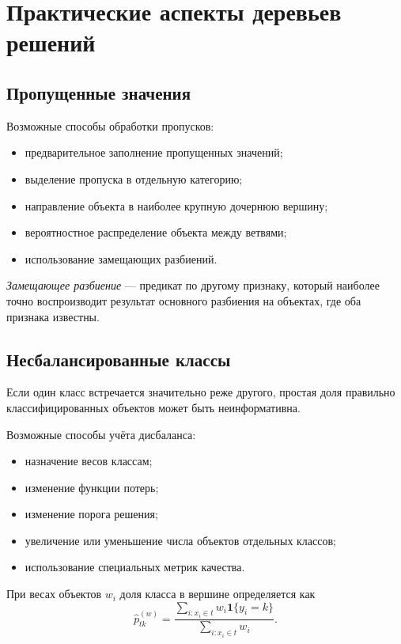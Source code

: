 \documentclass[12pt,a4paper]{article}
\theoremstyle{plain}
\theoremstyle{definition}
\theoremstyle{remark}
\newcommand{\ind}{\mathbf{1}}
\begin{document}
\section{Практические аспекты деревьев решений}

\subsection{Пропущенные значения}

Возможные способы обработки пропусков:
\begin{itemize}
    \item предварительное заполнение пропущенных значений;
    \item выделение пропуска в отдельную категорию;
    \item направление объекта в наиболее крупную дочернюю вершину;
    \item вероятностное распределение объекта между ветвями;
    \item использование замещающих разбиений.
\end{itemize}

\emph{Замещающее разбиение} --- предикат по другому признаку, который
наиболее точно воспроизводит результат основного разбиения на объектах,
где оба признака известны.

\subsection{Несбалансированные классы}

Если один класс встречается значительно реже другого, простая доля
правильно классифицированных объектов может быть неинформативна.

Возможные способы учёта дисбаланса:
\begin{itemize}
    \item назначение весов классам;
    \item изменение функции потерь;
    \item изменение порога решения;
    \item увеличение или уменьшение числа объектов отдельных классов;
    \item использование специальных метрик качества.
\end{itemize}

При весах объектов $w_i$ доля класса в вершине определяется как
\[
    \widehat{p}_{tk}^{(w)}
    =
    \frac{
        \displaystyle
        \sum_{i:x_i\in t}
        w_i\ind\{y_i=k\}
    }{
        \displaystyle
        \sum_{i:x_i\in t}w_i
    }.
\]
\end{document}
